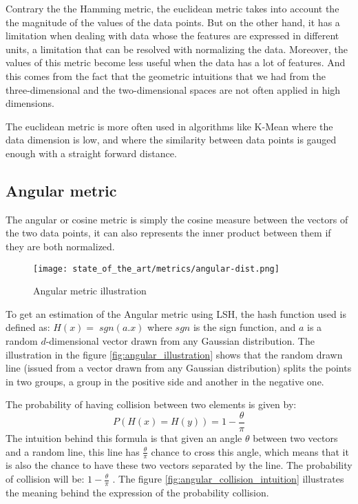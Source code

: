 Contrary the the Hamming metric, the euclidean metric takes into account the the
magnitude of the values of the data points. But on the other hand, it has a
limitation when dealing with data whose the features are expressed in different
units, a limitation that can be resolved with normalizing the data. Moreover,
the values of this metric become less useful when the data has a lot of
features. And this comes from the fact that the geometric intuitions that we had
from the three-dimensional and the two-dimensional spaces are not often applied
in high dimensions. \citep{domingos_few_2012}


The euclidean metric is more often used in algorithms like K-Mean where the data
dimension is low, and where the similarity between data points is gauged enough
with a straight forward distance.

\subsection{Angular metric}
\label{subsect:angular_metric}
The angular or cosine metric is simply the cosine measure between
the vectors of the two data points, it can also represents the inner product
between them if they are both normalized.

\begin{figure}[h]
    \centering
    \texttt{[image: state\_of\_the\_art/metrics/angular-dist.png]}
    \caption{Angular metric illustration}
    \label{fig:angular_metric}
\end{figure}

To get an estimation of the Angular metric using LSH, the hash function used
is defined as: $H(x)=\;sgn(a.x)$ where $sgn$ is the sign function, and $a$ is a
random $d$-dimensional vector drawn from any Gaussian distribution. The
illustration in the figure
\ref{fig:angular_illustration}
shows that the random drawn line (issued from a vector drawn from any Gaussian
distribution) splits the points in two groups, a group in the positive side and
another in the negative one.

The probability of having collision between two elements is given by:
$$
    P(H(x)=H(y))=1- \frac{\theta}{\pi}
$$
The intuition behind this formula is that given an angle $\theta$ between two
vectors and a random line, this line has $\frac{\theta}{\pi}$ chance to cross
this angle, which means that it is also the chance to have these two vectors
separated by the line. The probability of collision will be: $1 -
    \frac{\theta}{\pi}$ \citep{jafari_lsh_2017}. The figure
\ref{fig:angular_collision_intuition} illustrates the meaning behind the
expression of the probability collision.


